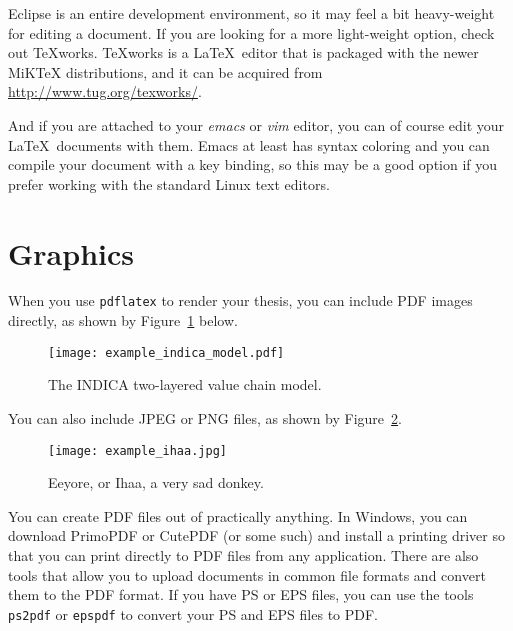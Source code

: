 \documentclass[12pt,a4paper,oneside,pdftex]{report}
\begin{document}
Eclipse is an entire development environment, so it may feel a bit heavy-weight
for editing a document.
If you are looking for a more light-weight option, check out TeXworks.
TeXworks is a \LaTeX\ editor that is packaged with the newer MiKTeX
distributions, and it can be acquired from \url{http://www.tug.org/texworks/}.

And if you are attached to your \emph{emacs} or \emph{vim} editor, you
can of course edit your \LaTeX\ documents with them.
Emacs at least has syntax coloring and you can compile your document with a key
binding, so this may be a good option if you prefer working with the standard
Linux text editors.

\section{Graphics}

When you use \texttt{pdflatex} to render your thesis, you can include PDF images
directly, as shown by Figure~\ref{fig:indica_model} below.

\begin{figure}[ht]
  \begin{center}
    \texttt{[image: example\_indica\_model.pdf]}
    \caption{The INDICA two-layered value chain model.}
    \label{fig:indica_model}
  \end{center}
\end{figure}

You can also include JPEG or PNG files, as shown by Figure~\ref{fig:eeyore}.

\begin{figure}[ht]
  \begin{center}
    \texttt{[image: example\_ihaa.jpg]}
    \caption{Eeyore, or Ihaa, a very sad donkey.}
    \label{fig:eeyore}
  \end{center}
\end{figure}

You can create PDF files out of practically anything.
In Windows, you can download PrimoPDF or CutePDF (or some such) and install a
printing driver so that you can print directly to PDF files from any
application. There are also tools that allow you to upload documents in common
file formats and convert them to the PDF format.
If you have PS or EPS files, you can use the tools \texttt{ps2pdf} or
\texttt{epspdf} to convert your PS and EPS files to PDF\@.

\end{document}
